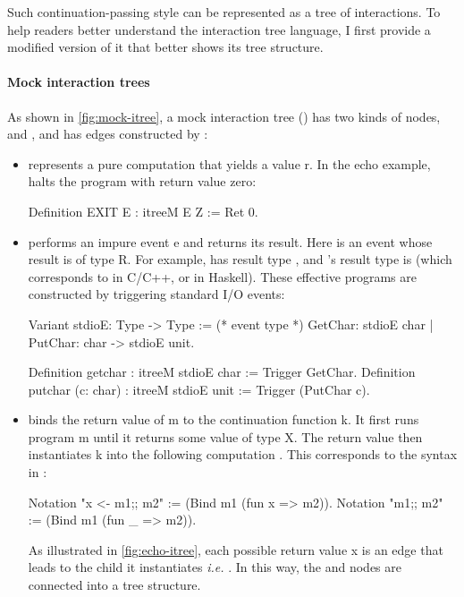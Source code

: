 Such continuation-passing style can be represented as a tree of interactions.
To help readers better understand the interaction tree language, I first provide
a modified version of it that better shows its tree structure.

\paragraph{Mock interaction trees}
As shown in \autoref{fig:mock-itree}, a mock interaction tree () has
two kinds of nodes,  and , and has edges constructed by
:
\begin{itemize}
\item {} represents a pure computation that yields a value \ilc r.
  In the echo example,  halts the program with return value zero:
\begin{coq}
  Definition EXIT {E} : itreeM E Z := Ret 0.
\end{coq}
\item {} performs an impure event \ilc e and returns its result.
  Here  is an event whose result is of type \ilc R.  For example,
   has result type , and 's result type is
   (which corresponds to  in C/C++, or \ilc{()} in
  Haskell).  These effective programs are constructed by triggering standard I/O
  events:
\begin{coq}
  Variant stdioE: Type -> Type := (* event type *)
    GetChar:         stdioE char
  | PutChar: char -> stdioE unit.
  
  Definition getchar : itreeM stdioE char := Trigger GetChar.
  Definition putchar (c: char) : itreeM stdioE unit
                               := Trigger (PutChar c).
\end{coq}
\item {} binds the return value of \ilc m to the continuation
  function \ilc k.  It first runs program \ilc m until it returns some value of
  type \ilc X.  The return value  then instantiates \ilc k into the
  following computation .  This corresponds to the
  \ilc{(;;)} syntax in :
\begin{coq}
  Notation "x <- m1;; m2" := (Bind m1 (fun x => m2)).
  Notation "m1;; m2"      := (Bind m1 (fun _ => m2)).
\end{coq}

As illustrated in \autoref{fig:echo-itree}, each possible return value \ilc x is
an edge that leads to the child it instantiates {\it i.e.} .  In this
way, the  and  nodes are connected into a tree
structure.
\end{itemize}

